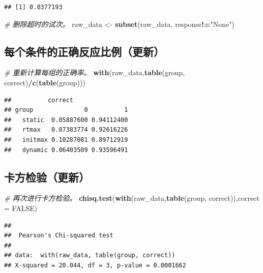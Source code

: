 \documentclass[
]{article}
\newenvironment{Shaded}{\begin{snugshade}}{\end{snugshade}}
\newcommand{\AttributeTok}[1]{\textcolor[rgb]{0.13,0.29,0.53}{#1}}
\newcommand{\CommentTok}[1]{\textcolor[rgb]{0.56,0.35,0.01}{\textit{#1}}}
\newcommand{\ConstantTok}[1]{\textcolor[rgb]{0.56,0.35,0.01}{#1}}
\newcommand{\FunctionTok}[1]{\textcolor[rgb]{0.13,0.29,0.53}{\textbf{#1}}}
\newcommand{\NormalTok}[1]{#1}
\newcommand{\OtherTok}[1]{\textcolor[rgb]{0.56,0.35,0.01}{#1}}
\newcommand{\SpecialCharTok}[1]{\textcolor[rgb]{0.81,0.36,0.00}{\textbf{#1}}}
\newcommand{\StringTok}[1]{\textcolor[rgb]{0.31,0.60,0.02}{#1}}
\begin{document}
\begin{verbatim}
## [1] 0.0377193
\end{verbatim}

\begin{Shaded}
\begin{Highlighting}[]
\CommentTok{\# 删除超时的试次。}
\NormalTok{raw\_data }\OtherTok{\textless{}{-}} \FunctionTok{subset}\NormalTok{(raw\_data, response}\SpecialCharTok{!=}\StringTok{"None"}\NormalTok{)}
\end{Highlighting}
\end{Shaded}

\subsection{每个条件的正确反应比例（更新）}\label{ux6bcfux4e2aux6761ux4ef6ux7684ux6b63ux786eux53cdux5e94ux6bd4ux4f8bux66f4ux65b0}

\begin{Shaded}
\begin{Highlighting}[]
\CommentTok{\# 重新计算每组的正确率。}
\FunctionTok{with}\NormalTok{(raw\_data,}\FunctionTok{table}\NormalTok{(group, correct)}\SpecialCharTok{/}\FunctionTok{c}\NormalTok{(}\FunctionTok{table}\NormalTok{(group)))}
\end{Highlighting}
\end{Shaded}

\begin{verbatim}
##          correct
## group              0          1
##   static  0.05887600 0.94112400
##   rtmax   0.07383774 0.92616226
##   initmax 0.10287081 0.89712919
##   dynamic 0.06403509 0.93596491
\end{verbatim}

\subsection{卡方检验（更新）}\label{ux5361ux65b9ux68c0ux9a8cux66f4ux65b0}

\begin{Shaded}
\begin{Highlighting}[]
\CommentTok{\# 再次进行卡方检验。}
\FunctionTok{chisq.test}\NormalTok{(}\FunctionTok{with}\NormalTok{(raw\_data,}\FunctionTok{table}\NormalTok{(group, correct)),}\AttributeTok{correct =} \ConstantTok{FALSE}\NormalTok{)}
\end{Highlighting}
\end{Shaded}

\begin{verbatim}
## 
##  Pearson's Chi-squared test
## 
## data:  with(raw_data, table(group, correct))
## X-squared = 20.044, df = 3, p-value = 0.0001662
\end{verbatim}
\end{document}
